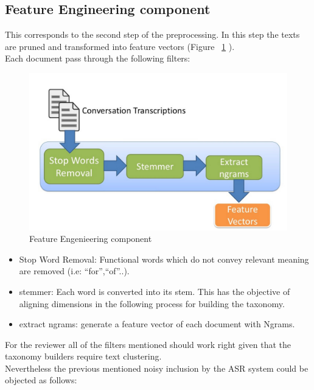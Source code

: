 \documentclass[4pt,a4paper,twocolumn]{article}
\begin{document}
\subsection{Feature Engineering component}

This corresponds to the second step of the preprocessing. In this step the texts are pruned and transformed into feature vectors (Figure ~\ref{fig:eng_component} ).\\
Each document pass through the following filters:

\begin{figure}[]
  \centering
    \includegraphics[scale=0.2]{pics/eng_component.jpg}
    \caption{Feature Engenieering component}
   \label{fig:eng_component}  
\end{figure}

\begin{itemize}
	\item Stop Word Removal: Functional words which do not convey relevant meaning are removed (i.e: ``for'',``of''..).
	
	\item stemmer: Each word is converted into its stem. This has the objective of aligning dimensions in the following process for building the taxonomy.
	
	\item extract ngrams:  generate a feature vector of each document with Ngrams.
\end{itemize}

For the reviewer all of the filters mentioned should work right given that the taxonomy builders require text clustering.\\
Nevertheless the previous mentioned noisy inclusion by the ASR system could be objected as follows:
\end{document}
